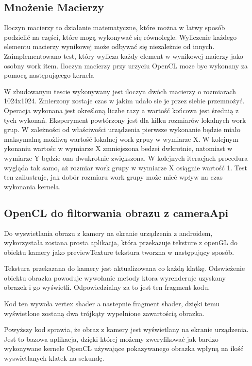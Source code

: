 \subsection[Mnożenie macierzy]{Mnożenie Macierzy}
Iloczyn macierzy to działanie matematyczne, które można w łatwy sposób podzielić na części, które mogą wykonywać się równolegle. Wyliczenie każdego elementu macierzy wynikowej może odbywać się niezależnie od innych. Zaimplementowano test, który wylicza każdy element w wynikowej maierzy jako osobny work item. Iloczyn macierzy przy urzyciu OpenCL moze byc wykonany za pomocą następującego kernela

W zbudowanym tescie wykonywany jest iloczyn dwóch macierzy o rozmiarach 1024x1024. Zmierzony zostaje czas w jakim udało sie je przez siebie przemnożyć. Operacja wykonana jest określoną liczbe razy a wartość końcowa jest średnią z tych wykonań. Eksperyment powtórzony jest dla kilku rozmiarów lokalnych work grup. W zależności od właściwości urządzenia pierwsze wykonanie będzie miało maksymalną możliwą wartość lokalnej work grpuy w wymiarze X. W kolejnym ykonaniu wartośc w wymiarze X zmniejszona bedzei dwkrotnie, natomiast w wymiarze Y będzie ona dwukrotnie zwiększona. W kolejnych iteracjach procedura wygląda tak samo, aż rozmiar work grupy w wymiarze X osiągnie wartość 1. Test ten zailustruje, jak dobór rozmiaru work grupy może mieć wpływ na czas wykonania kernela.
\subsection[OpenCL do filtorwania obrazu z cameraApi]{OpenCL do filtorwania obrazu z cameraApi}
Do wyswietlania obrazu z kamery na ekranie urządzenia z androidem, wykorzystała zostana prosta aplikacja, która przekazuje teksture z openGL do obiektu kamery jako previewTexture tekstura tworzna w następujący sposób.

 Tekstura przekazana do kamery jest aktualizowana co każdą klatkę. Odswieżenie obiektu obrazka powoduje wywołanie metody ktora wyrenderuje uzyskany obrazek i go wyświetli. Odpowiedzialny za to jest ten fragment kodu.
 

Kod ten wywoła vertex shader a nastepnie fragment shader, dzięki temu wyświetlone zostaną dwa trójkąty wypełnione zawartością obrazka.

Powyższy kod sprawia, że obraz z kamery jest wyświetlany na ekranie urządzenia. Jest to bazowa aplikacja, dzięki której możemy zweryfikować jak bardzo wykonywane kernele OpenCL używające pokazywanego obrazka wpłyną na ilość wyswietlanych klatek na sekundę.
